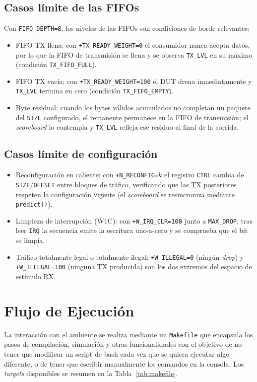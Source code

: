 \documentclass[conference]{IEEEtran}
\begin{document}
\subsection{Casos límite de las FIFOs}
Con \texttt{FIFO\_DEPTH=8}, los niveles de las FIFOs son condiciones de borde
relevantes:
\begin{itemize}
  \item FIFO TX llena: con \texttt{+TX\_READY\_WEIGHT=0} el consumidor
  nunca acepta datos, por lo que la FIFO de transmisión se llena y se observa
  \texttt{TX\_LVL} en su máximo (condición \texttt{TX\_FIFO\_FULL}).
  \item FIFO TX vacía: con \texttt{+TX\_READY\_WEIGHT=100} el DUT drena
  inmediatamente y \texttt{TX\_LVL} termina en cero (condición
  \texttt{TX\_FIFO\_EMPTY}).
  \item Byte residual: cuando los bytes válidos acumulados no completan
  un paquete del \texttt{SIZE} configurado, el remanente permanece en la FIFO de
  transmisión; el \textit{scoreboard} lo contempla y \texttt{TX\_LVL} refleja
  ese residuo al final de la corrida.
\end{itemize}

\subsection{Casos límite de configuración}
\begin{itemize}
  \item Reconfiguración en caliente: con \texttt{+N\_RECONFIG=}$k$ el
  registro \texttt{CTRL} cambia de \texttt{SIZE}/\texttt{OFFSET} entre bloques de
  tráfico, verificando que las TX posteriores respeten la configuración vigente
  (el \textit{scoreboard} se resincroniza mediante \texttt{predict()}).
  \item Limpieza de interrupción (W1C): con \texttt{+W\_IRQ\_CLR=100}
  junto a \texttt{MAX\_DROP}, tras leer \texttt{IRQ} la secuencia emite la
  escritura uno-a-cero y se comprueba que el bit se limpia.
  \item Tráfico totalmente legal o totalmente ilegal:
  \texttt{+W\_ILLEGAL=0} (ningún \textit{drop}) y \texttt{+W\_ILLEGAL=100}
  (ninguna TX producida) son los dos extremos del espacio de estímulo RX.
\end{itemize}

\section{Flujo de Ejecución}
La interacción con el ambiente se realiza mediante un \texttt{Makefile} que
encapsula los pasos de compilación, simulación y otras funcionalidades con el objetivo de no tener que modificar un script de bash cada vez que se quiera ejecutar algo diferente, o de tener que escribir manualmente los comandos en la consola. Los \textit{targets}
disponibles se resumen en la Tabla~\ref{tab:makefile}.
\end{document}
